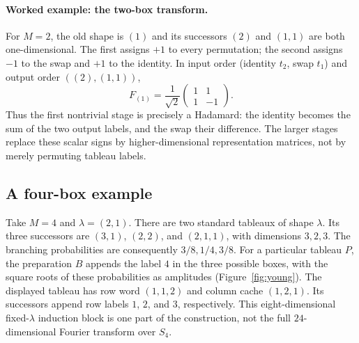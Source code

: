 \documentclass[11pt]{article}
\theoremstyle{definition}
\begin{document}
\paragraph{Worked example: the two-box transform.}
For $M=2$, the old shape is $(1)$ and its successors $(2)$ and $(1,1)$
are both one-dimensional. The first assigns $+1$ to every permutation;
the second assigns $-1$ to the swap and $+1$ to the identity. In input
order (identity $t_2$, swap $t_1$) and output order $((2),(1,1))$,
\[
 F_{(1)}=\frac1{\sqrt2}
 \begin{pmatrix}1&1\\1&-1\end{pmatrix}.
\]
Thus the first nontrivial stage is precisely a Hadamard: the identity
becomes the sum of the two output labels, and the swap their difference.
The larger stages replace these scalar signs by higher-dimensional
representation matrices, not by merely permuting tableau labels.

\subsection{A four-box example}\label{sec:example}

Take $M=4$ and $\lambda=(2,1)$. There are two standard tableaux of shape
$\lambda$. Its three successors are $(3,1)$, $(2,2)$, and $(2,1,1)$,
with dimensions $3,2,3$. The branching probabilities are consequently
$3/8,1/4,3/8$. For a particular tableau $P$, the preparation $B$ appends
the label $4$ in the three possible boxes, with the square roots of these
probabilities as amplitudes (Figure~\ref{fig:young}).
The displayed tableau has row word $(1,1,2)$ and column cache $(1,2,1)$.
Its successors append row labels $1$, $2$, and $3$, respectively.
This eight-dimensional fixed-$\lambda$ induction block is one part of the
construction, not the full $24$-dimensional Fourier transform over $S_4$.
\end{document}
